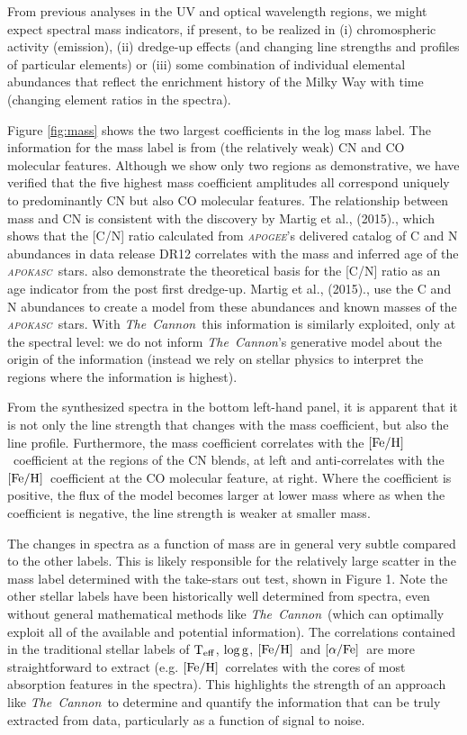 \documentclass[12pt, preprint]{aastex}
\newcommand{\project}[1]{\textsl{#1}}
\newcommand{\tc}{\project{The~Cannon}}
\newcommand{\apogee}{\project{\textsc{apogee}}}
\newcommand{\apokasc}{\project{\textsc{apokasc}}}
\newcommand{\teff}{\mbox{$\rm T_{eff}$}}
\newcommand{\feh}{\mbox{$\rm [Fe/H]$}}
\newcommand{\alphafe}{\mbox{$\rm [\alpha/Fe]$}}
\newcommand{\logg}{\mbox{$\rm \log g$}}
\begin{document}
From previous analyses in the UV and optical wavelength regions, we might expect spectral mass indicators, if present, to be realized in (i) chromospheric activity (emission), (ii) dredge-up effects (and changing line strengths and profiles of particular elements) or (iii) some combination of individual elemental abundances that reflect the enrichment history of the Milky Way with time (changing element ratios in the spectra). 

Figure \ref{fig:mass} shows the two largest coefficients in the log mass label. The information for the mass label is from (the relatively weak) CN and CO molecular features. Although we show only two regions as demonstrative, we have verified that the five highest mass coefficient amplitudes all correspond uniquely to predominantly CN but also CO molecular features. The relationship between mass and CN is consistent with the discovery by Martig et al., (2015)., which shows that the [C/N] ratio calculated from \apogee's delivered catalog of C and N abundances in data release DR12 correlates with the mass and inferred age of the \apokasc\ stars. \citet{Sal2015} also demonstrate the theoretical basis for the [C/N] ratio as an age indicator from the post first dredge-up. Martig et al., (2015)., use the C and N abundances to create a model from these abundances and known masses of the \apokasc\ stars. With \tc\, this information is similarly exploited, only at the spectral level: we do not inform \tc's generative model about the origin of the information (instead we rely on stellar physics to interpret the regions where the information is highest). 

From the synthesized spectra in the bottom left-hand panel, it is apparent that it is not only the line strength that changes with the mass coefficient, but also the line profile. Furthermore, the mass coefficient correlates with the \feh\ coefficient at the regions of the CN blends, at left and anti-correlates with the \feh\ coefficient at the CO molecular feature, at right. Where the coefficient is positive, the flux of the model becomes larger at lower mass where as when the coefficient is negative, the line strength is weaker at smaller mass.  

The changes in spectra as a function of mass are in general very subtle compared to the other labels. This is likely responsible for the relatively large scatter in the mass label determined with the take-stars out test, shown in Figure 1. Note the other stellar labels have been historically well determined from spectra, even without general mathematical methods like \tc\ (which can optimally exploit all of the available and potential information). The correlations contained in the traditional stellar labels of \teff, \logg, \feh\ and \alphafe\ are more straightforward to extract (e.g. \feh\ correlates with the cores of most absorption features in the spectra). This highlights the strength of an approach like \tc\ to determine and quantify the information that can be truly extracted from data, particularly as a function of signal to noise. 
\end{document}
